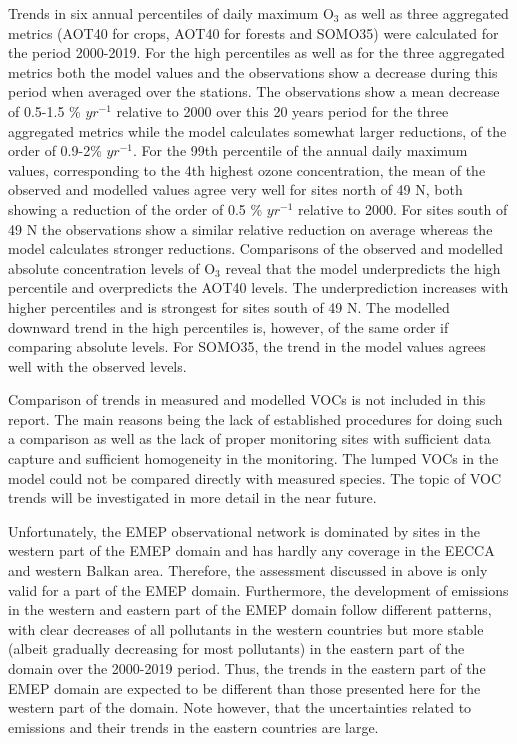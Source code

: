 Trends in six annual percentiles of daily maximum O$_3$ as well as three aggregated metrics (AOT40 for crops, AOT40 for forests and SOMO35) were calculated for the period 2000-2019. For the high percentiles as well as for the three aggregated metrics both the model values and the observations show a decrease during this period when averaged over the stations. The observations show a mean decrease of 0.5-1.5 \% $yr^{-1}$ relative to 2000 over this 20 years period for the three aggregated metrics while the model calculates somewhat larger reductions, of the order of 0.9-2\% $yr^{-1}$. For the 99th percentile of the annual daily maximum values, corresponding to the 4th highest ozone concentration, the mean of the observed and modelled values agree very well for sites north of 49 \degrees N, both showing a reduction of the order of 0.5  \% $yr^{-1}$ relative to 2000. For sites south of 49 \degrees N the observations show a similar relative reduction on average whereas the model calculates stronger reductions. Comparisons of the observed and modelled absolute concentration levels of O$_3$ reveal that the model underpredicts the high percentile and overpredicts the AOT40 levels. The underprediction increases with higher percentiles and is strongest for sites south of 49 \degrees N. The modelled downward trend in the high percentiles is, however, of the same order if comparing absolute levels. For SOMO35, the trend in the model values agrees well with the observed levels.

Comparison of trends in measured and modelled VOCs is not included in this report. The main reasons being the lack of established procedures for doing such a comparison as well as the lack of proper monitoring sites with sufficient data capture and sufficient homogeneity in the monitoring. The lumped VOCs in the model could not be compared directly with measured species. The topic of VOC trends will be investigated in more detail in the near future.  




Unfortunately, the EMEP observational network is dominated by sites in the western part of the EMEP domain and has hardly any coverage in the EECCA and western Balkan area. Therefore, the assessment discussed in above is only valid for a part of the EMEP domain. Furthermore, the development of emissions in the western and eastern part of the EMEP domain follow different patterns, with clear decreases of all pollutants in the western countries  but more stable (albeit gradually decreasing for most pollutants) in the eastern part of the domain over the 2000-2019 period. Thus, the trends in the eastern part of the EMEP domain are expected to be different than those presented here for the western part of the domain. Note however, that the uncertainties related to emissions and their trends in the eastern countries are large.










